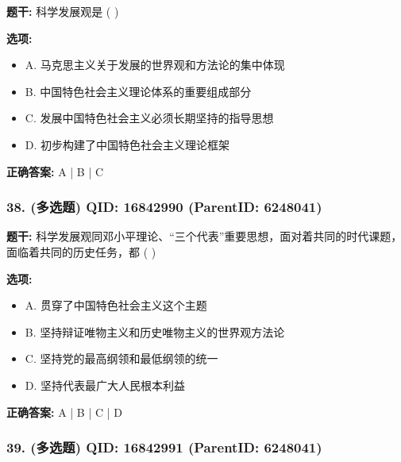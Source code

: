\documentclass[12pt,UTF8]{ctexart}
\begin{document}
\textbf{题干:}
科学发展观是 ( )



\textbf{选项:}
\begin{itemize}[leftmargin=*]

  \item A. 马克思主义关于发展的世界观和方法论的集中体现

  \item B. 中国特色社会主义理论体系的重要组成部分

  \item C. 发展中国特色社会主义必须长期坚持的指导思想

  \item D. 初步构建了中国特色社会主义理论框架

\end{itemize}

\textbf{正确答案:}
A | B | C

\vspace{0.3em}\hrulefill\vspace{0.7em}

\subsubsection*{38. (多选题) \small QID: 16842990 (ParentID: 6248041)}

\textbf{题干:}
科学发展观同邓小平理论、“三个代表”重要思想，面对着共同的时代课题，面临着共同的历史任务，都 ( )



\textbf{选项:}
\begin{itemize}[leftmargin=*]

  \item A. 贯穿了中国特色社会主义这个主题

  \item B. 坚持辩证唯物主义和历史唯物主义的世界观方法论

  \item C. 坚持党的最高纲领和最低纲领的统一

  \item D. 坚持代表最广大人民根本利益

\end{itemize}

\textbf{正确答案:}
A | B | C | D

\vspace{0.3em}\hrulefill\vspace{0.7em}

\subsubsection*{39. (多选题) \small QID: 16842991 (ParentID: 6248041)}
\end{document}
